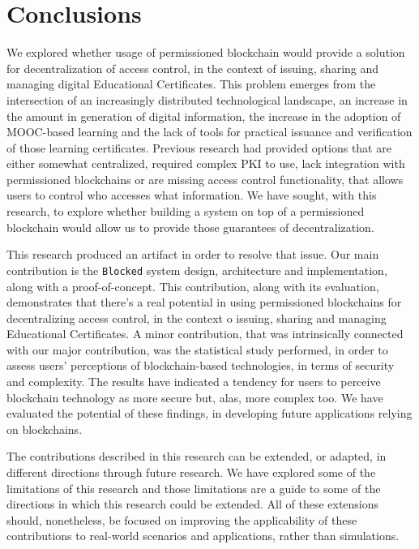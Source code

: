 \section{Conclusions}

We explored whether usage of permissioned blockchain would provide a solution for decentralization of access control, in the context of issuing, sharing and managing digital Educational Certificates. This problem emerges from the intersection of an increasingly distributed technological landscape, an increase in the amount in generation of digital information, the increase in the adoption of MOOC-based learning and the lack of tools for practical issuance and verification of those learning certificates. Previous research had provided options that are either somewhat centralized, required complex PKI to use, lack integration with permissioned blockchains or are missing access control functionality, that allows users to control who accesses what information. We have sought, with this research, to explore whether building a system on top of a permissioned blockchain would allow us to provide those guarantees of decentralization.

This research produced an artifact in order to resolve that issue. Our main contribution is the \texttt{Blocked} system design, architecture and implementation, along with a proof-of-concept. This contribution, along with its evaluation, demonstrates that there's a real potential in using permissioned blockchains for decentralizing access control, in the context o issuing, sharing and managing Educational Certificates. A minor contribution, that was intrinsically connected with our major contribution, was the statistical study performed, in order to assess users' perceptions of blockchain-based technologies, in terms of security and complexity. The results have indicated a tendency for users to perceive blockchain technology as more secure but, alas, more complex too. We have evaluated the potential of these findings, in developing future applications relying on blockchains.

The contributions described in this research can be extended, or adapted, in different directions through future research. We have explored some of the limitations of this research and those limitations are a guide to some of the directions in which this research could be extended. All of these extensions should, nonetheless, be focused on improving the applicability of these contributions to real-world scenarios and applications, rather than simulations.
